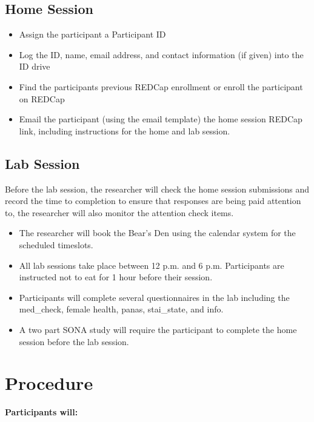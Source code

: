 \documentclass[]{book}
\providecommand{\tightlist}{%
  \setlength{\itemsep}{0pt}\setlength{\parskip}{0pt}}
\begin{document}
\hypertarget{home-session}{%
\subsection{Home Session}\label{home-session}}

\begin{itemize}
\tightlist
\item
  Assign the participant a Participant ID
\item
  Log the ID, name, email address, and contact information (if given) into the ID drive
\item
  Find the participants previous REDCap enrollment or enroll the participant on REDCap
\item
  Email the participant (using the email template) the home session REDCap link, including instructions for the home and lab session.
\end{itemize}

\hypertarget{lab-session}{%
\subsection{Lab Session}\label{lab-session}}

Before the lab session, the researcher will check the home session submissions and record the time to completion to ensure that responses are being paid attention to, the researcher will also monitor the attention check items.

\begin{itemize}
\item
  The researcher will book the Bear's Den using the calendar system for the scheduled timeslots.
\item
  All lab sessions take place between 12 p.m. and 6 p.m. Participants are instructed not to eat for 1 hour before their session.
\item
  Participants will complete several questionnaires in the lab including the med\_check, female health, panas, stai\_state, and info.
\item
  A two part SONA study will require the participant to complete the home session before the lab session.
\end{itemize}

\hypertarget{procedure-1}{%
\section{Procedure}\label{procedure-1}}

\textbf{Participants will:}
\end{document}
